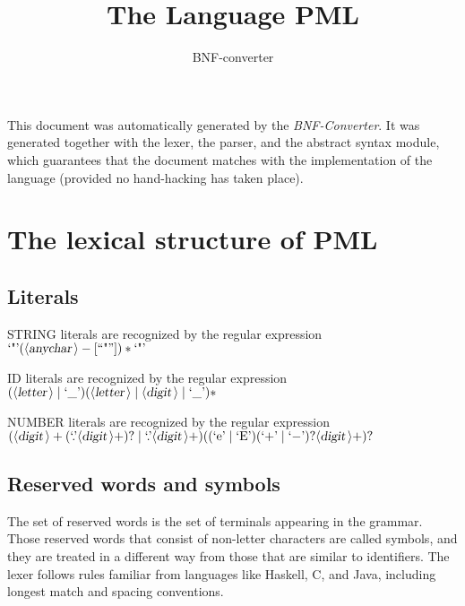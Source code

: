\documentclass[a4paper,11pt]{article}
\author{BNF-converter}
\title{The Language PML}
\begin{document}
\maketitle

\newcommand{\emptyP}{\mbox{$\epsilon$}}
\newcommand{\terminal}[1]{\mbox{{\texttt {#1}}}}
\newcommand{\nonterminal}[1]{\mbox{$\langle \mbox{{\sl #1 }} \! \rangle$}}
\newcommand{\arrow}{\mbox{::=}}
\newcommand{\delimit}{\mbox{$|$}}
\newcommand{\reserved}[1]{\mbox{{\texttt {#1}}}}
\newcommand{\literal}[1]{\mbox{{\texttt {#1}}}}
\newcommand{\symb}[1]{\mbox{{\texttt {#1}}}}

This document was automatically generated by the {\em BNF-Converter}. It was generated together with the lexer, the parser, and the abstract syntax module, which guarantees that the document matches with the implementation of the language (provided no hand-hacking has taken place).

\section*{The lexical structure of PML}

\subsection*{Literals}




STRING literals are recognized by the regular expression
\(\mbox{`"'} ({\nonterminal{anychar}} - [\mbox{``"''}])* \mbox{`"'}\)

ID literals are recognized by the regular expression
\(({\nonterminal{letter}} \mid \mbox{`\_'}) ({\nonterminal{letter}} \mid {\nonterminal{digit}} \mid \mbox{`\_'})*\)

NUMBER literals are recognized by the regular expression
\(({\nonterminal{digit}}+ (\mbox{`.'} {\nonterminal{digit}}+)? \mid \mbox{`.'} {\nonterminal{digit}}+) ((\mbox{`e'} \mid \mbox{`E'}) (\mbox{`{$+$}'} \mid \mbox{`{$-$}'})? {\nonterminal{digit}}+)?\)


\subsection*{Reserved words and symbols}
The set of reserved words is the set of terminals appearing in the grammar. Those reserved words that consist of non-letter characters are called symbols, and they are treated in a different way from those that are similar to identifiers. The lexer follows rules familiar from languages like Haskell, C, and Java, including longest match and spacing conventions.
\end{document}
